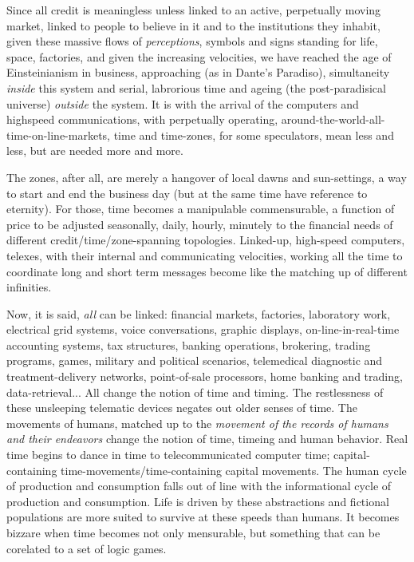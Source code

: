 \documentclass[11pt,twoside,draft]{memoir}
\begin{document}
Since all credit is meaningless unless
linked to an active, perpetually moving
market, linked to people to believe in it and
to the institutions they inhabit, given these
massive flows of \emph{perceptions}, symbols and
signs standing for life, space, factories, and
given the increasing velocities, we have
reached the age of Einsteinianism in business, approaching (as in Dante's Paradiso),
simultaneity \emph{inside} this system and serial,
labrorious time and ageing (the post-paradisical universe) \emph{outside} the system. It is
with the arrival of the computers and highspeed communications, with perpetually
operating, around-the-world-all-time-on-line-markets, time and time-zones,
for some speculators, mean less and less, but are
needed more and more.

The zones, after all, are merely a hangover
of local dawns and sun-settings, a way to
start and end the business day (but at the
same time have reference to eternity). For
those, time becomes a manipulable commensurable, a function of price to be adjusted
seasonally, daily, hourly, minutely to the financial needs of different credit\slash time\slash zone-spanning topologies. Linked-up, high-speed
computers, telexes, with their internal and
communicating velocities, working all the
time to coordinate long and short term messages become like the matching up of different infinities.

Now, it is said, \emph{all} can be linked: financial
markets, factories, laboratory work, electrical grid systems, voice conversations, graphic
displays, on-line-in-real-time accounting
systems, tax structures, banking operations,
brokering, trading programs, games, military and political scenarios, telemedical
diagnostic and treatment-delivery networks,
point-of-sale processors, home banking and
trading, data-retrieval... All change the notion of time and timing. The restlessness of
these unsleeping telematic devices negates
out older senses of time. The movements of
humans, matched up to the \emph{movement of the records of humans and their endeavors}
change the notion of time, timeing and human behavior. Real time begins to dance in
time to telecommunicated computer time;
capital-containing time-movements\slash time-containing capital movements. The human
cycle of production and consumption falls
out of line with the informational cycle of
production and consumption. Life is driven
by these abstractions and fictional populations are more suited to survive at these
speeds than humans. It becomes bizzare
when time becomes not only mensurable,
but something that can be corelated to a set
of logic games.
\end{document}
